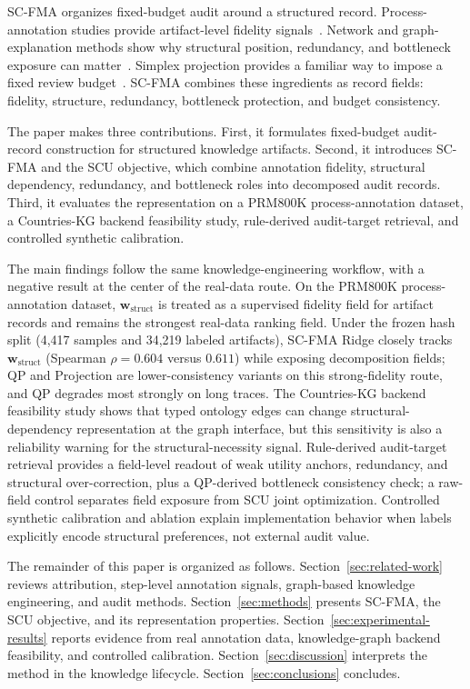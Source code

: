 \documentclass[a4paper,fleqn]{cas-sc}
\newcommand{\wstruct}{\ensuremath{\mathbf{w}_{\mathrm{struct}}}}
\begin{document}
SC-FMA organizes fixed-budget audit around a structured record. Process-annotation studies provide artifact-level fidelity signals~\cite{lightman2023verify,uesato2022solving}. Network and graph-explanation methods show why structural position, redundancy, and bottleneck exposure can matter~\cite{albert2000error,newman2010networks,ying2019gnnexplainer}. Simplex projection provides a familiar way to impose a fixed review budget~\cite{wang2013projection}. SC-FMA combines these ingredients as record fields: fidelity, structure, redundancy, bottleneck protection, and budget consistency.

The paper makes three contributions. First, it formulates fixed-budget audit-record construction for structured knowledge artifacts. Second, it introduces SC-FMA and the SCU objective, which combine annotation fidelity, structural dependency, redundancy, and bottleneck roles into decomposed audit records. Third, it evaluates the representation on a PRM800K process-annotation dataset, a Countries-KG backend feasibility study, rule-derived audit-target retrieval, and controlled synthetic calibration.

The main findings follow the same knowledge-engineering workflow, with a negative result at the center of the real-data route. On the PRM800K process-annotation dataset, \wstruct{} is treated as a supervised fidelity field for artifact records and remains the strongest real-data ranking field. Under the frozen hash split (4,417 samples and 34,219 labeled artifacts), SC-FMA Ridge closely tracks \wstruct{} (Spearman $\rho = 0.604$ versus $0.611$) while exposing decomposition fields; QP and Projection are lower-consistency variants on this strong-fidelity route, and QP degrades most strongly on long traces. The Countries-KG backend feasibility study shows that typed ontology edges can change structural-dependency representation at the graph interface, but this sensitivity is also a reliability warning for the structural-necessity signal. Rule-derived audit-target retrieval provides a field-level readout of weak utility anchors, redundancy, and structural over-correction, plus a QP-derived bottleneck consistency check; a raw-field control separates field exposure from SCU joint optimization. Controlled synthetic calibration and ablation explain implementation behavior when labels explicitly encode structural preferences, not external audit value.

The remainder of this paper is organized as follows. Section~\ref{sec:related-work} reviews attribution, step-level annotation signals, graph-based knowledge engineering, and audit methods. Section~\ref{sec:methods} presents SC-FMA, the SCU objective, and its representation properties. Section~\ref{sec:experimental-results} reports evidence from real annotation data, knowledge-graph backend feasibility, and controlled calibration. Section~\ref{sec:discussion} interprets the method in the knowledge lifecycle. Section~\ref{sec:conclusions} concludes.
\end{document}

